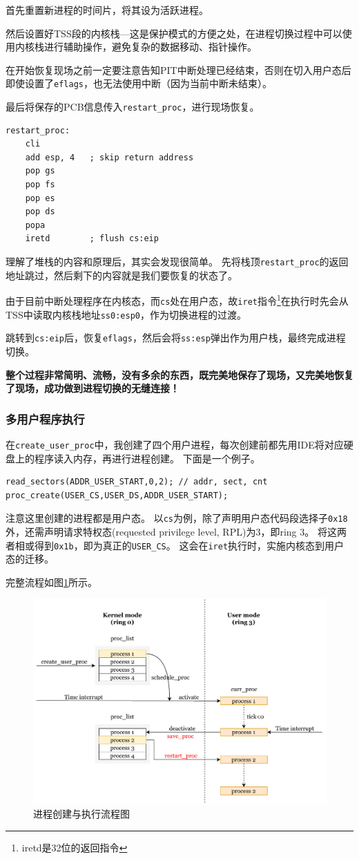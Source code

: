 \documentclass[logo,reportComp]{thesis}
\begin{document}
首先重置新进程的时间片，将其设为活跃进程。

然后设置好TSS段的内核栈---这是保护模式的方便之处，在进程切换过程中可以使用内核栈进行辅助操作，避免复杂的数据移动、指针操作。

在开始恢复现场之前一定要注意告知PIT中断处理已经结束，否则在切入用户态后即使设置了\verb'eflags'，也无法使用中断（因为当前中断未结束）。

最后将保存的PCB信息传入\verb'restart_proc'，进行现场恢复。
\begin{lstlisting}[language={[x86masm]Assembler}]
restart_proc:
	cli
	add esp, 4   ; skip return address
	pop gs
	pop fs
	pop es
	pop ds
	popa
	iretd        ; flush cs:eip
\end{lstlisting}

理解了堆栈的内容和原理后，其实会发现很简单。
先将栈顶\verb'restart_proc'的返回地址跳过，然后剩下的内容就是我们要恢复的状态了。

由于目前中断处理程序在内核态，而\verb'cs'处在用户态，故\verb'iret'指令\footnote{iretd是32位的返回指令}在执行时先会从TSS中读取内核栈地址\verb'ss0:esp0'，作为切换进程的过渡。

跳转到\verb'cs:eip'后，恢复\verb'eflags'，然后会将\verb'ss:esp'弹出作为用户栈，最终完成进程切换。

\textbf{整个过程非常简明、流畅，没有多余的东西，既完美地保存了现场，又完美地恢复了现场，成功做到进程切换的无缝连接！}

\subsubsection{多用户程序执行}
在\verb'create_user_proc'中，我创建了四个用户进程，每次创建前都先用IDE将对应硬盘上的程序读入内存，再进行进程创建。
下面是一个例子。
\begin{lstlisting}
read_sectors(ADDR_USER_START,0,2); // addr, sect, cnt
proc_create(USER_CS,USER_DS,ADDR_USER_START);
\end{lstlisting}

注意这里创建的进程都是用户态。
以\verb'cs'为例，除了声明用户态代码段选择子\verb'0x18'外，还需声明请求特权态(requested privilege level, RPL)为3，即ring 3。
将这两者相或得到\verb'0x1b'，即为真正的\verb'USER_CS'。
这会在\verb'iret'执行时，实施内核态到用户态的迁移。

完整流程如图\ref{fig:process-run}所示。
\begin{figure}[H]
\centering
\includegraphics[width=0.8\linewidth]{fig/process-run.pdf}
\caption{进程创建与执行流程图}
\label{fig:process-run}
\end{figure}
\end{document}
